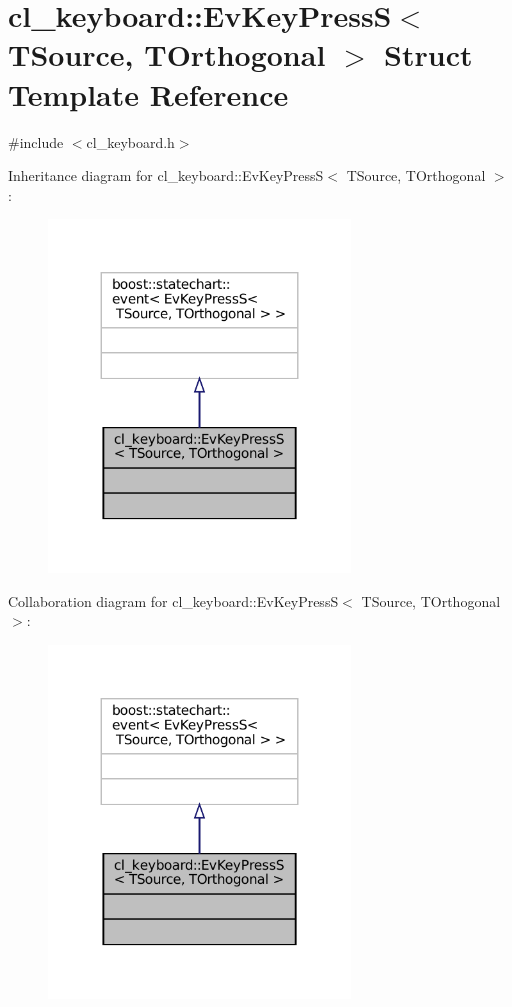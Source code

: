 \hypertarget{structcl__keyboard_1_1EvKeyPressS}{}\section{cl\+\_\+keyboard\+:\+:Ev\+Key\+PressS$<$ T\+Source, T\+Orthogonal $>$ Struct Template Reference}
\label{structcl__keyboard_1_1EvKeyPressS}


{\ttfamily \#include $<$cl\+\_\+keyboard.\+h$>$}



Inheritance diagram for cl\+\_\+keyboard\+:\+:Ev\+Key\+PressS$<$ T\+Source, T\+Orthogonal $>$\+:
\nopagebreak
\begin{figure}[H]
\begin{center}
\leavevmode
\includegraphics[width=227pt]{structcl__keyboard_1_1EvKeyPressS__inherit__graph}
\end{center}
\end{figure}


Collaboration diagram for cl\+\_\+keyboard\+:\+:Ev\+Key\+PressS$<$ T\+Source, T\+Orthogonal $>$\+:
\nopagebreak
\begin{figure}[H]
\begin{center}
\leavevmode
\includegraphics[width=227pt]{structcl__keyboard_1_1EvKeyPressS__coll__graph}
\end{center}
\end{figure}


